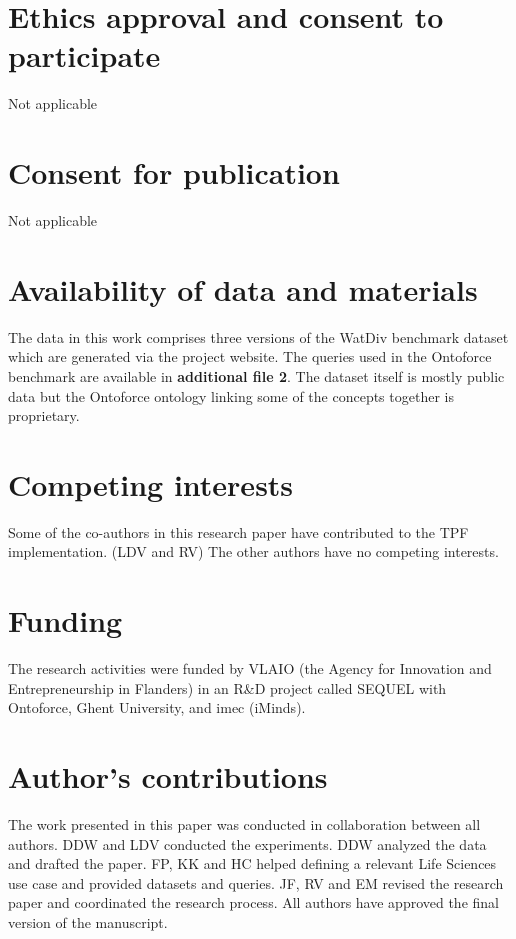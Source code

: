 \documentclass[twocolumn]{bmcart}%
\begin{document}
\begin{backmatter}

\section*{Ethics approval and consent to participate}
Not applicable

\section*{Consent for publication}
Not applicable

\section*{Availability of data and materials}

The data in this work comprises three versions of the WatDiv benchmark dataset which are generated via the project website. The queries used in the Ontoforce
benchmark are available in \textbf{additional file 2}. The dataset itself is mostly public data but the Ontoforce ontology linking some of the concepts together is proprietary. 

\section*{Competing interests}
Some of the co-authors in this research paper have contributed to the TPF implementation. (LDV and RV) The other authors have no competing interests.

\section*{Funding}
The research activities were funded by VLAIO (the Agency for Innovation and Entrepreneurship in Flanders) in an R\&D project called SEQUEL with Ontoforce, Ghent University, and imec (iMinds). 

\section*{Author's contributions}
The work presented in this paper was conducted in collaboration between all authors. DDW and
LDV conducted the experiments. DDW analyzed the data and drafted the paper. FP, KK and HC helped defining a relevant Life Sciences use case and provided datasets and queries. JF, RV and EM revised the research paper and coordinated the research process. All authors have approved the final version of the manuscript. 


\end{backmatter}
\end{document}
